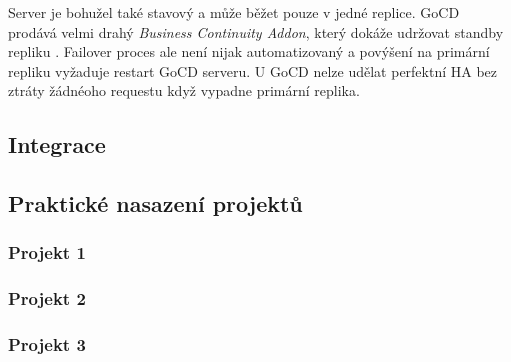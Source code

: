         Server je bohužel také stavový a může běžet pouze v jedné replice. GoCD prodává velmi drahý \textit{Business Continuity Addon}, který dokáže udržovat standby repliku \cite{gocd-ha}. Failover proces ale není nijak automatizovaný a povýšení na primární repliku vyžaduje restart GoCD serveru. U GoCD nelze udělat perfektní HA bez ztráty žádnéoho requestu když vypadne primární replika.

        \blind[1]

    \subsection{Integrace}
        \blind[2]
        \blind[5]

    \subsection{Praktické nasazení projektů}
        \subsubsection{Projekt 1}
            \blind[2]

        \subsubsection{Projekt 2}
            \blind[2]

        \subsubsection{Projekt 3}
            \blind[2]
